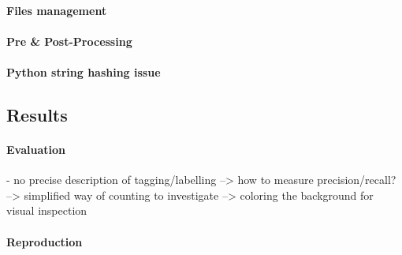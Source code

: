 \documentclass[11pt]{article}
\begin{document}
\paragraph{Files management}

\paragraph{Pre & Post-Processing}

\paragraph{Python string hashing issue}

\subsection{Results}

\paragraph{Evaluation}

- no precise description of tagging/labelling --> how to measure precision/recall? --> simplified way of counting to investigate --> coloring the background for visual inspection

\paragraph{Reproduction}



\newpage
 
\end{document}
